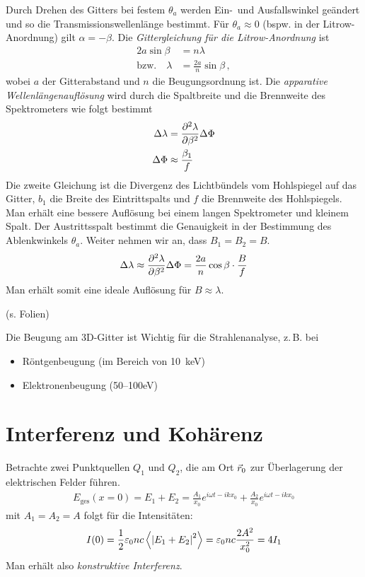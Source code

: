 Durch Drehen des Gitters bei festem $\theta_a$
werden Ein-~und Ausfallswinkel geändert und so die
Transmissionswellenlänge bestimmt.
Für $\theta_a\approx 0$ (bspw. in der
Litrow-Anordnung) gilt $\alpha=-\beta$.
Die \emph{Gittergleichung für die Litrow-Anordnung}%
 ist
\begin{align*}
  2a\sin\beta &=n\lambda\\
  \text{bzw.}\quad \lambda &= \frac{2a}{n}\sin\beta\,,
\end{align*}
wobei $a$ der Gitterabstand und $n$ die Beugungsordnung ist. 
Die \emph{apparative Wellenlängenauflösung} wird durch die Spaltbreite
und die Brennweite des Spektrometers wie folgt bestimmt
\begin{align*}
	\Delta\lambda &=\diff[\lambda]{\beta}\Delta\Phi\\
	\Delta\Phi &\approx \frac{\beta_1}{f}
\end{align*}
Die zweite Gleichung ist die Divergenz des Lichtbündels vom
Hohlspiegel auf das Gitter, $b_1$ die Breite des Eintrittspalts und
$f$ die Brennweite des Hohlspiegels. Man erhält eine bessere Auflösung
bei einem langen Spektrometer und kleinem Spalt. Der Austrittsspalt
bestimmt die Genauigkeit in der Bestimmung des Ablenkwinkels
$\theta_a$. Weiter nehmen wir an, dass $B_1=B_2=B$.
\begin{align*}
  \Delta\lambda 
  \approx \diff[\lambda]{\beta}\Delta\Phi
  = \frac{2a}{n}\cos\beta \cdot \frac{B}{f}
\end{align*}
Man erhält somit eine ideale Auflösung für $B\approx\lambda$.

(s. Folien)

Die Beugung am 3D-Gitter ist Wichtig für die Strahlenanalyse, z.\,B. bei
\begin{itemize}
	\item Röntgenbeugung (im Bereich von \SI{10}{\kilo\eV})
	\item Elektronenbeugung (50–100\si{\eV})
\end{itemize}


\section{Interferenz und Kohärenz}
Betrachte zwei Punktquellen $Q_1$ und $Q_2$, die am Ort $\vecr_0$ zur
Überlagerung der elektrischen Felder führen. 
\begin{align*}
  E_\text{ges}(x=0) 
  = E_1+E_2
  =\frac{A_1}{x_0}e^{i\omega t-ikx_0} + \frac{A_2}{x_0}e^{i\omega t- ikx_0}
\end{align*}
mit $A_1=A_2=A$ folgt für die Intensitäten:
\begin{align*}
  I(0)
  = \fracone{2}\epso nc\left\langle\left|E_1 + E_2\right|^2\right\rangle 
  = \epso nc\frac{2A^2}{x_0^2}
  = 4I_1
\end{align*}
Man erhält also \emph{konstruktive Interferenz}.

